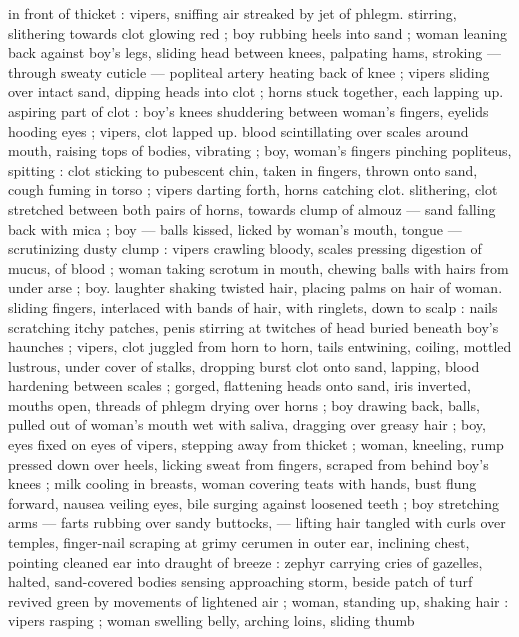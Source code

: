 {in front of thicket : vipers, sniffing air streaked by jet of phlegm. 
stirring, slithering towards clot glowing red ; boy rubbing heels into 
sand ; woman leaning back against boy's legs, sliding head between 
knees, palpating hams, stroking --- through sweaty cuticle --- 
popliteal artery heating back of knee ; vipers sliding over intact 
sand, dipping heads into clot ; horns stuck together, each lapping up. 
aspiring part of clot : boy's knees shuddering between woman's 
fingers, eyelids hooding eyes ; vipers, clot lapped up. blood 
scintillating over scales around mouth, raising tops of bodies, 
vibrating ; boy, woman's fingers pinching popliteus, spitting : clot 
sticking to pubescent chin, taken in fingers, thrown onto sand, cough 
fuming in torso ; vipers darting forth, horns catching clot. slithering, 
clot stretched between both pairs of horns, towards clump of almouz 
--- sand falling back with mica ; boy --- balls kissed, licked by 
woman's mouth, tongue --- scrutinizing dusty clump : vipers crawling 
bloody, scales pressing digestion of mucus, of blood ; woman taking 
scrotum in mouth, chewing balls with hairs from under arse ; boy. 
laughter shaking twisted hair, placing palms on hair of woman. sliding 
fingers, interlaced with bands of hair, with ringlets, down to scalp : 
nails scratching itchy patches, penis stirring at twitches of head 
buried beneath boy's haunches ; vipers, clot juggled from horn to 
horn, tails entwining, coiling, mottled lustrous, under cover of stalks, 
dropping burst clot onto sand, lapping, blood hardening between 
scales ; gorged, flattening heads onto sand, iris inverted, mouths 
open, threads of phlegm drying over horns ; boy drawing back, balls, 
pulled out of woman's mouth wet with saliva, dragging over greasy 
hair ; boy, eyes fixed on eyes of vipers, stepping away from thicket ; 
woman, kneeling, rump pressed down over heels, licking sweat from 
fingers, scraped from behind boy's knees ; milk cooling in breasts, 
woman covering teats with hands, bust flung forward, nausea veiling 
eyes, bile surging against loosened teeth ; boy stretching arms --- 
farts rubbing over sandy buttocks, --- lifting hair tangled with curls 
over temples, finger-nail scraping at grimy cerumen in outer ear, 
inclining chest, pointing cleaned ear into draught of breeze : zephyr 
carrying cries of gazelles, halted, sand-covered bodies sensing 
approaching storm, beside patch of turf revived green by 
movements of lightened air ; woman, standing up, shaking hair : 
vipers rasping ; woman swelling belly, arching loins, sliding thumb 
}
